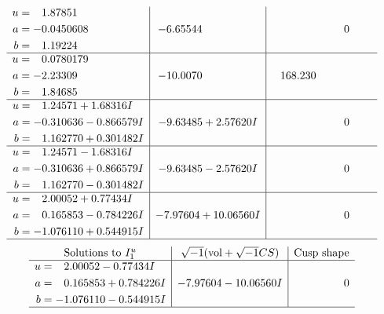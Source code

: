 \documentclass[1p]{elsarticle_modified}
\theoremstyle{definition}
\newcommand{\I}{\sqrt{-1}}
\begin{document}
$$\begin{array}{c|c|c}
\begin{aligned}
u &= \phantom{-}1.87851\phantom{ +0.000000I} \\
a &= -0.0450608\phantom{ +0.000000I} \\
b &= \phantom{-}1.19224\phantom{ +0.000000I}\end{aligned}
 & -6.65544\phantom{ +0.000000I} & \phantom{-0.000000 } 0 \\ \hline\begin{aligned}
u &= \phantom{-}0.0780179\phantom{ +0.000000I} \\
a &= -2.23309\phantom{ +0.000000I} \\
b &= \phantom{-}1.84685\phantom{ +0.000000I}\end{aligned}
 & -10.0070\phantom{ +0.000000I} & \phantom{-}168.230\phantom{ +0.000000I} \\ \hline\begin{aligned}
u &= \phantom{-}1.24571 + 1.68316 I \\
a &= -0.310636 - 0.866579 I \\
b &= \phantom{-}1.162770 + 0.301482 I\end{aligned}
 & -9.63485 + 2.57620 I & \phantom{-0.000000 } 0 \\ \hline\begin{aligned}
u &= \phantom{-}1.24571 - 1.68316 I \\
a &= -0.310636 + 0.866579 I \\
b &= \phantom{-}1.162770 - 0.301482 I\end{aligned}
 & -9.63485 - 2.57620 I & \phantom{-0.000000 } 0 \\ \hline\begin{aligned}
u &= \phantom{-}2.00052 + 0.77434 I \\
a &= \phantom{-}0.165853 - 0.784226 I \\
b &= -1.076110 + 0.544915 I\end{aligned}
 & -7.97604 + 10.06560 I & \phantom{-0.000000 } 0\\
 \hline 
 \end{array}$$\newpage$$\begin{array}{c|c|c}  
\text{Solutions to }I^u_{1}& \I (\text{vol} + \sqrt{-1}CS) & \text{Cusp shape}\\
 \hline 
\begin{aligned}
u &= \phantom{-}2.00052 - 0.77434 I \\
a &= \phantom{-}0.165853 + 0.784226 I \\
b &= -1.076110 - 0.544915 I\end{aligned}
 & -7.97604 - 10.06560 I & \phantom{-0.000000 } 0\\
 \hline 
 \end{array}$$\newpage\newpage\renewcommand{\arraystretch}{1}
\end{document}
